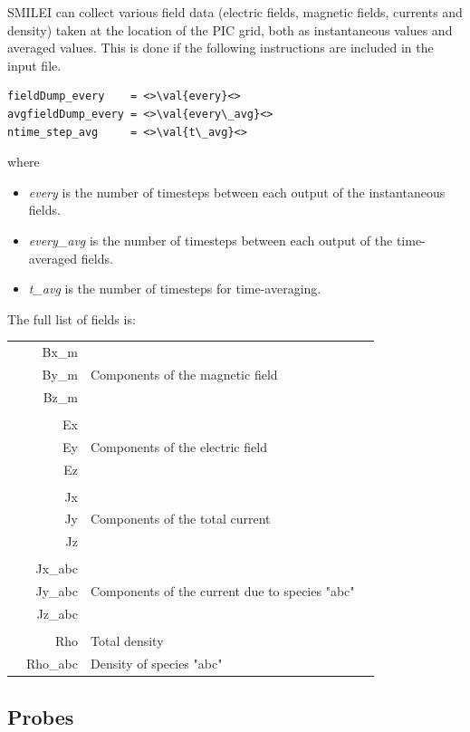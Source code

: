 \documentclass[11pt]{article}
\newcommand{\val}[1]{{\ttfamily \textit{#1}}}
\begin{document}
SMILEI can collect various field data (electric fields, magnetic fields, currents and density)
taken at the location of the PIC grid, both as instantaneous values and averaged values.
This is done if the following instructions are included in the input file.
\begin{lstlisting}
fieldDump_every    = <>\val{every}<>
avgfieldDump_every = <>\val{every\_avg}<>
ntime_step_avg     = <>\val{t\_avg}<>
\end{lstlisting}\vspace{-10pt}
where\vspace{-10pt}
\begin{itemize}
\item \val{every} is the number of timesteps between each output of the instantaneous fields.
\item \val{every\_avg} is the number of timesteps between each output of the time-averaged fields.
\item \val{t\_avg} is the number of timesteps for time-averaging.
\end{itemize}
The full list of fields is:
\begin{longtabu}{X r | l X}
& Bx\_m &  & \\
& By\_m &  Components of the magnetic field & \\
& Bz\_m &  & \\
& & & \\
& Ex &  & \\
& Ey & Components of the electric field & \\
& Ez &  & \\
& & & \\
& Jx &  & \\
& Jy & Components of the total current & \\
& Jz &  & \\
& & & \\
& Jx\_abc &  & \\
& Jy\_abc & Components of the current due to species "abc" & \\
& Jz\_abc &  & \\
& & & \\
& Rho & Total density & \\
& Rho\_abc & Density of species "abc" & \\
\end{longtabu}


\subsection{Probes\label{sec:probes}}
\end{document}

